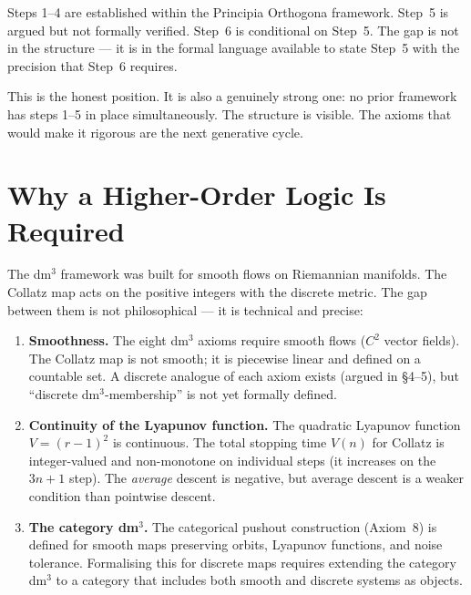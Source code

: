 \documentclass[11pt]{article}
\theoremstyle{plain}
\theoremstyle{definition}
\begin{document}
\medskip
Steps 1--4 are established within the Principia Orthogona framework.
Step~5 is argued but not formally verified. Step~6 is conditional on
Step~5. The gap is not in the structure --- it is in the formal
language available to state Step~5 with the precision that Step~6
requires.

This is the honest position. It is also a genuinely strong one:
no prior framework has steps 1--5 in place simultaneously. The
structure is visible. The axioms that would make it rigorous are the
next generative cycle.

\section{Why a Higher-Order Logic Is Required}

The dm$^3$ framework was built for smooth flows on Riemannian
manifolds. The Collatz map acts on the positive integers with the
discrete metric. The gap between them is not philosophical --- it is
technical and precise:

\begin{enumerate}[label=\arabic*., leftmargin=*, itemsep=4pt]
  \item \textbf{Smoothness.} The eight dm$^3$ axioms require smooth
    flows ($C^2$ vector fields). The Collatz map is not smooth; it is
    piecewise linear and defined on a countable set. A discrete
    analogue of each axiom exists (argued in \S4--5), but ``discrete
    dm$^3$-membership'' is not yet formally defined.

  \item \textbf{Continuity of the Lyapunov function.} The quadratic
    Lyapunov function $V = (r-1)^2$ is continuous. The total stopping
    time $V(n)$ for Collatz is integer-valued and non-monotone on
    individual steps (it increases on the $3n+1$ step). The
    \textit{average} descent is negative, but average descent is a
    weaker condition than pointwise descent.

  \item \textbf{The category dm$^3$.} The categorical pushout
    construction (Axiom~8) is defined for smooth maps preserving
    orbits, Lyapunov functions, and noise tolerance. Formalising
    this for discrete maps requires extending the category dm$^3$
    to a category that includes both smooth and discrete systems
    as objects.
\end{enumerate}
\end{document}
